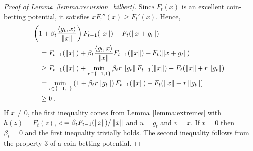 \begin{proof}[Proof of Lemma~\ref{lemma:recursion_hilbert}]
Since $F_t(x)$ is an excellent coin-betting potential, it satisfies $x
F_t''(x) \ge F_t'(x)$. Hence,
\begin{align*}
&\left(1 + \beta_t \frac{\langle g_t, x \rangle}{\|x\|} \right) F_{t-1}(\left\|{x}\right\|) - F_t(\left\|{x + g_t}\right\|) \\
&\quad = F_{t-1}(\left\|{x}\right\|) + \beta_t \frac{\langle g_t, x \rangle}{\|x\|} F_{t-1}(\left\|{x}\right\|) - F_t(\left\|{x + g_t}\right\|) \\
&\quad \ge F_{t-1}(\left\|{x}\right\|)+\min_{r \in \{-1,1\}} \beta_t r \left\|{g_t}\right\| F_{t-1}(\left\|{x}\right\|) - F_t(\left\|{x}\right\| + r \left\|{g_t}\right\|) \\
&\quad =\min_{r \in \{-1,1\}} \left(1 + \beta_t r \left\|{g_t}\right\|\right) F_{t-1}(\left\|{x}\right\|) - F_t(\left\|{x}\right\| + r \left\|{g_t}\right\|) \\
&\quad \ge 0 \; .
\end{align*}
If $x \neq 0$, the first inequality comes from Lemma~\ref{lemma:extremes} with $h(z) = F_t(z)$,
$c = \beta_t F_{t-1}(\left\|{x}\right\|) / \left\|{x}\right\|$ and $u=g_t$ and $v=x$.
If $x=0$ then $\beta_t = 0$ and the first inequality trivially holds.
The second inequality follows from the property 3 of a coin-betting potential.
\end{proof}
